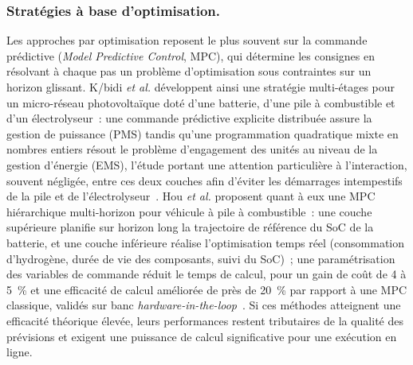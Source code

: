 \subsubsection{Stratégies à base d'optimisation.}
Les approches par optimisation reposent le plus souvent sur la commande prédictive (\textit{Model Predictive Control}, MPC), qui détermine les consignes en résolvant à chaque pas un problème d'optimisation sous contraintes sur un horizon glissant.
K/bidi \textit{et al.} développent ainsi une stratégie multi-étages pour un micro-réseau photovoltaïque doté d'une batterie, d'une pile à combustible et d'un électrolyseur~: une commande prédictive explicite distribuée assure la gestion de puissance (PMS) tandis qu'une programmation quadratique mixte en nombres entiers résout le problème d'engagement des unités au niveau de la gestion d'énergie (EMS), l'étude portant une attention particulière à l'interaction, souvent négligée, entre ces deux couches afin d'éviter les démarrages intempestifs de la pile et de l'électrolyseur~\cite{kbidi_multistage_2022}.
Hou \textit{et al.} proposent quant à eux une MPC hiérarchique multi-horizon pour véhicule à pile à combustible~: une couche supérieure planifie sur horizon long la trajectoire de référence du SoC de la batterie, et une couche inférieure réalise l'optimisation temps réel (consommation d'hydrogène, durée de vie des composants, suivi du SoC)~; une paramétrisation des variables de commande réduit le temps de calcul, pour un gain de coût de 4 à 5~\% et une efficacité de calcul améliorée de près de 20~\% par rapport à une MPC classique, validés sur banc \textit{hardware-in-the-loop}~\cite{hou_hierarchical_2025}.
Si ces méthodes atteignent une efficacité théorique élevée, leurs performances restent tributaires de la qualité des prévisions et exigent une puissance de calcul significative pour une exécution en ligne.

